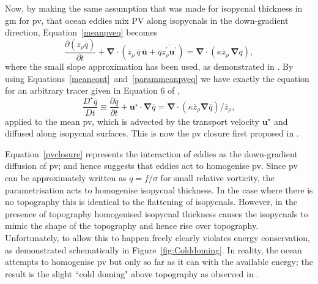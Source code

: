 \documentclass[12pt,a4paper]{report}
\newcommand*\mean[1]{\overline{#1}}
\newcommand*\res[1]{{#1}^{\prime}}
\newcommand*\figref[1]{Figure~\ref{#1}}
\newcommand*\equref[1]{Equation~\eqref{#1}}
\begin{document}
                Now, by making the same assumption that was made for isopycnal thickness in 
                \gls{gm} for \gls{pv}, that ocean eddies mix PV along isopycnals in the down-gradient direction, \equref{meanpveq} becomes
                \begin{equation}
                \frac{\partial \left(\mean{z}_{\rho} \mean{q}\right)}{\partial t} +
                \boldsymbol{\nabla}\cdot\left(\mean{z}_{\rho}\,\mean{q}\,\mean{\boldsymbol{u}}+\mean{q}\mean{\res{z}_{\rho} \res{\boldsymbol{u}}}\right)
                = \boldsymbol{\nabla}\cdot\left(\kappa \mean{z}_{\rho}\,\boldsymbol{\nabla}\mean{q}\right) ,
                \label{parammeanpveq}
                \end{equation}
                where the small slope approximation has been used, as demonstrated in
                \cite{gent1990}. By using Equations~\ref{meancont}~and~\ref{parammeanpveq} we have exactly the equation for an arbitrary tracer given in Equation 6 of \cite{gent1995parameterizing},
                \begin{equation}
                \frac{D^\star \mean{q}}{D t}\equiv\frac{\partial \mean{q}}{\partial t} + \boldsymbol{u}^\star\cdot\boldsymbol{\nabla}\mean{q} = \boldsymbol{\nabla}\cdot
                \left(\kappa \mean{z}_{\rho}\boldsymbol{\nabla} \mean{q} \right)/\mean{z}_{\rho} ,
                \label{pvclosure}
                \end{equation}
                applied to the mean \gls{pv}, which is advected by the transport velocity $\boldsymbol{u}^\star$ and diffused along isopycnal surfaces. This is now
                the \gls{pv} closure first proposed in \cite{greatbatch1998exploring}.
                
                \equref{pvclosure} represents the interaction of eddies as the
                down-gradient diffusion of \gls{pv}; and hence suggests that eddies
                act to homogenise \gls{pv}. Since \gls{pv} can be approximately written
                as $q=f/\sigma$ for small relative vorticity, the parametrisation acts  to homogenise isopycnal thickness. In the case 
                where there is no topography this is identical to the flattening of isopycnals.
                However, in the presence of topography homogenised isopycnal thickness
                causes the isopycnals to mimic the shape of the topography and hence 
                rise over topography. Unfortunately, to allow this to happen freely
                clearly violates energy conservation, as demonstrated schematically in 
                \figref{fig:Colddoming}. In reality, the ocean attempts to 
                homogenise \gls{pv} but only so far as it can with the available energy;
                the result is the slight ``cold doming" above topography as observed in
                \cite{adcock2000interactions}. 
                
\end{document}
